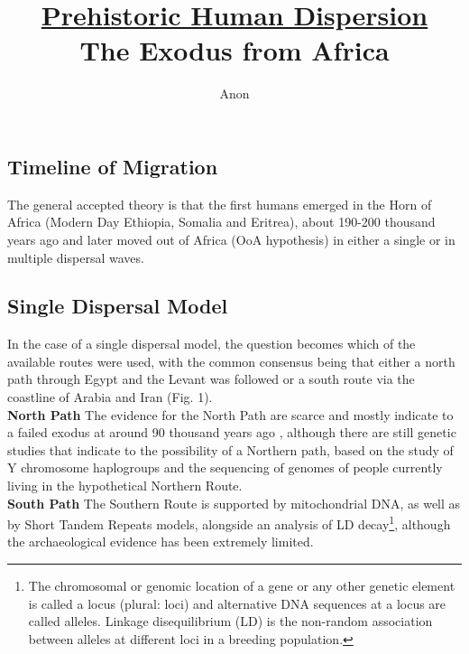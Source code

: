 \documentclass[11pt]{article}
\title{\huge{\textbf{\underline{Prehistoric Human Dispersion}}}\\ \Large{The Exodus from Africa}}
\author{Anon}
\date{}
\begin{document}
\maketitle


\begin{multicols}{2}
\tableofcontents

\section{Timeline of Migration}
The general accepted theory is that the first humans emerged in the Horn of Africa (Modern Day Ethiopia, Somalia and Eritrea), about 190-200 thousand years ago\cite{EOBO, BEBO} and later moved out of Africa (OoA hypothesis) in either a single or in multiple dispersal waves.
\subsection{Single Dispersal Model}
In the case of a single dispersal model, the question becomes which of the available routes were used, with the common consensus being that either a north path through Egypt and the Levant was followed or a south route via the coastline of Arabia and Iran (Fig. 1).\\
\textbf{North Path} The evidence for the North Path are scarce and mostly indicate to a failed exodus at around 90 thousand years ago \cite{EOBO}, although there are still genetic studies that indicate to the possibility of a Northern path, based on the study of Y chromosome haplogroups\cite{LEVA} and the sequencing of genomes of people currently living in the hypothetical Northern Route\cite{EGPT}.\\
\textbf{South Path} The Southern Route is supported by mitochondrial DNA, as well as by Short Tandem Repeats models, alongside an analysis of LD decay\footnote{The chromosomal or genomic location of a gene or any other genetic element is called a locus (plural: loci) and alternative DNA sequences at a locus are called alleles. Linkage disequilibrium (LD) is the non-random association between alleles at different loci in a breeding population.}, although the archaeological evidence has been extremely limited.



\end{multicols}
\end{document}

